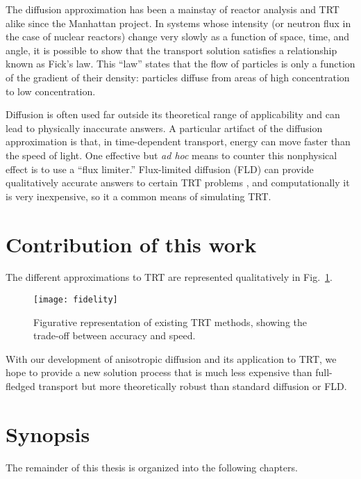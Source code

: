 The diffusion approximation has been a mainstay of reactor analysis and TRT
alike since the Manhattan project. In systems whose intensity (or neutron flux
in the case of nuclear reactors) change very slowly as a function of space, time, and
angle, it is possible to show \cite{Lar1975,Lar1983a} that the transport
solution satisfies a relationship known as Fick's law. This ``law'' states that
the flow of particles is only a function of the gradient of their density:
particles diffuse from areas of high concentration to low concentration.

Diffusion is often used far outside its theoretical range of applicability and
can lead to physically inaccurate answers. A particular artifact of the
diffusion approximation is that, in time-dependent transport, energy can
move faster than the speed of light. One effective but \emph{ad hoc} means to
counter this nonphysical effect is to use a ``flux limiter.''
Flux-limited diffusion (FLD) can provide qualitatively accurate answers to
certain TRT problems \cite{Ols2000}, and computationally it is very
inexpensive, so it a common means of simulating TRT.

\section{Contribution of this work}

The different approximations to TRT are represented qualitatively in
Fig.~\ref{fig:fidelity}.

\begin{figure}[htb]
  \centering
  \texttt{[image: fidelity]}
  \caption{Figurative representation of existing TRT methods, showing the
  trade-off between accuracy and speed.}
  \label{fig:fidelity}
\end{figure}

With our development of anisotropic diffusion and its application to TRT, we
hope to provide a new solution process that is much less expensive than
full-fledged transport but more theoretically robust than standard diffusion or
FLD.

\section{Synopsis}

The remainder of this thesis is organized into the following chapters.

